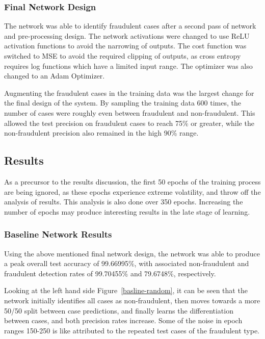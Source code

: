 \documentclass{article}
\begin{document}
\subsubsection{Final Network Design}

 The network was able to identify fraudulent cases after a second pass of network and pre-processing 
 design. The network activations were changed to use ReLU activation functions to avoid the narrowing 
 of outputs. The cost function was switched to MSE to avoid the required clipping of outputs, as cross 
 entropy requires log functions which have a limited input range. The optimizer was also changed to 
 an Adam Optimizer. 

 Augmenting the fraudulent cases in the training data was the largest change for the final design 
 of the system. By sampling the training data 600 times, the number of cases were roughly even 
 between fraudulent and non-fraudulent. This allowed the test precision on fraudulent cases to 
 reach 75\% or greater, while the non-fraudulent precision also remained in the high  90\% range.

\subsection{Results}

 As a precursor to the results discussion, the first 50 epochs of the training process are being ignored,
 as these epochs experience extreme volatility, and throw off the analysis of results. This analysis is 
 also done over 350 epochs. Increasing the number of epochs may produce interesting results in the 
 late stage of learning. 

\subsubsection{Baseline Network Results}

 Using the above mentioned final network design, the network was able to produce a peak overall 
 test accuracy of 99.66995\%, with associated non-fraudulent and fraudulent detection rates of 
 99.70455\% and 79.6748\%, respectively. 

 Looking at the left hand side Figure~\ref{basline-random}, it can be seen that the network initially identifies all 
 cases as non-fraudulent, then moves towards a more 50/50 split between case predictions, and 
 finally learns the differentiation between cases, and both precision rates increase. Some of the
 noise in epoch ranges 150-250 is like attributed to the repeated test cases of the fraudulent type. 
\end{document}
